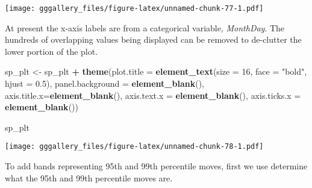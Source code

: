 \documentclass[]{book}
\newenvironment{Shaded}{\begin{snugshade}}{\end{snugshade}}
\newcommand{\DataTypeTok}[1]{\textcolor[rgb]{0.13,0.29,0.53}{#1}}
\newcommand{\DecValTok}[1]{\textcolor[rgb]{0.00,0.00,0.81}{#1}}
\newcommand{\FloatTok}[1]{\textcolor[rgb]{0.00,0.00,0.81}{#1}}
\newcommand{\KeywordTok}[1]{\textcolor[rgb]{0.13,0.29,0.53}{\textbf{#1}}}
\newcommand{\NormalTok}[1]{#1}
\newcommand{\OperatorTok}[1]{\textcolor[rgb]{0.81,0.36,0.00}{\textbf{#1}}}
\newcommand{\StringTok}[1]{\textcolor[rgb]{0.31,0.60,0.02}{#1}}
\begin{document}
\begin{Shaded}
\end{Shaded}

\texttt{[image: gggallery\_files/figure-latex/unnamed-chunk-77-1.pdf]}

At present the x-axis labels are from a categorical variable, \emph{MonthDay}. The hundreds of overlapping values being displayed can be removed to de-clutter the lower portion of the plot.

\begin{Shaded}
\begin{Highlighting}[]
\NormalTok{sp_plt <-}\StringTok{ }\NormalTok{sp_plt }\OperatorTok{+}\StringTok{ }
\StringTok{  }\KeywordTok{theme}\NormalTok{(}\DataTypeTok{plot.title =} \KeywordTok{element_text}\NormalTok{(}\DataTypeTok{size =} \DecValTok{16}\NormalTok{, }\DataTypeTok{face =} \StringTok{"bold"}\NormalTok{, }\DataTypeTok{hjust =} \FloatTok{0.5}\NormalTok{), }
        \DataTypeTok{panel.background =} \KeywordTok{element_blank}\NormalTok{(), }\DataTypeTok{axis.title.x=}\KeywordTok{element_blank}\NormalTok{(), }
        \DataTypeTok{axis.text.x =}  \KeywordTok{element_blank}\NormalTok{(), }\DataTypeTok{axis.ticks.x =} \KeywordTok{element_blank}\NormalTok{()) }

\NormalTok{sp_plt}
\end{Highlighting}
\end{Shaded}

\texttt{[image: gggallery\_files/figure-latex/unnamed-chunk-78-1.pdf]}

To add bands representing 95th and 99th percentile moves, first we use determine what the 95th and 99th percentile moves are.
\end{document}
